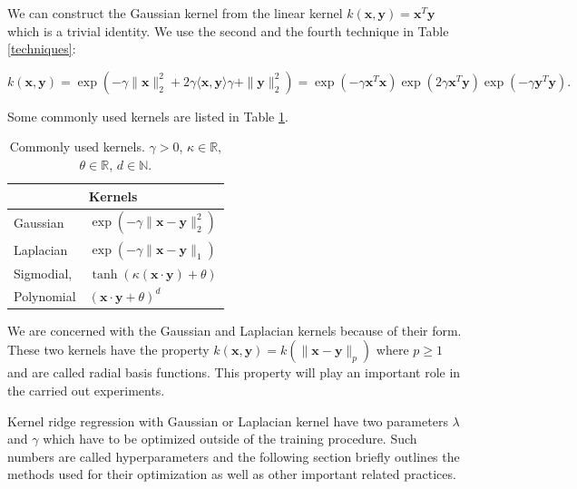 \documentclass[11pt,american]{book} %
\theoremstyle{plain}
\theoremstyle{definition}
\begin{document}
We can construct the Gaussian kernel from the linear kernel $k(\bm{x}, \bm{y}) = \bm{x}^T \bm{y}$ which is a trivial identity. We use the second and the fourth technique in Table \ref{techniques}:

\begin{equation}
	k(\bm{x}, \bm{y})= \exp(-\gamma \|\bm{x} \|^2_2 + 2\gamma \langle \bm{x}, \bm{y} \rangle \gamma + \|\bm{y} \|^2_2) = \exp(-\gamma \bm{x}^T \bm{x})  \exp(2\gamma  \bm{x}^T \bm{y})  \exp(-\gamma \bm{y}^T \bm{y}).
\end{equation}

Some commonly used kernels are listed in Table \ref{kernely}.

\begin{table}[H]
	\centering
	\begin{tabular}{ll} 
		\hline
		& Kernels  \\ 
		\hline
		Gaussian & $ \exp(-\gamma \|\bm{x}-\bm{y} \|^2_2)$   \\
		Laplacian & $ \exp(-\gamma \|\bm{x}-\bm{y} \|_1)$   \\
		Sigmodial, & $\tanh(\kappa (\bm{x} \cdot \bm{y}) + \theta)$   \\
		Polynomial & $(\bm{x} \cdot \bm{y} + \theta)^d$ \\
		\hline
	\end{tabular}
	\caption{Commonly used kernels. $\gamma > 0$, $\kappa \in \mathbb{R}$, $\theta \in \mathbb{R}$, $d \in \mathbb{N}$.}
	\label{kernely}
\end{table}

We are concerned with the Gaussian and Laplacian kernels because of their form. These two kernels have the property $k(\bm{x}, \bm{y}) = k(\| \bm{x}-\bm{y} \|_p)$ where $p\geq1$ and are called radial basis functions. This property will play an important role in the carried out experiments.

Kernel ridge regression with Gaussian or Laplacian kernel have two parameters $\lambda$ and $\gamma$ which have to be optimized outside of the training procedure. Such numbers are called hyperparameters and the following section briefly outlines the methods used for their optimization as well as other important related practices.
\end{document}
